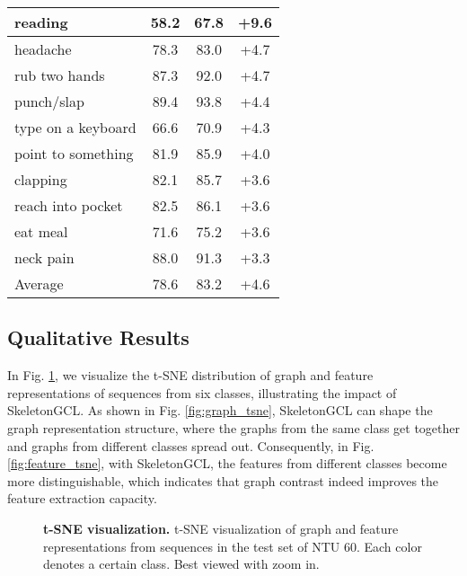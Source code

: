 \documentclass{article} \usepackage{iclr2023_conference,times}
\begin{document}
\begin{minipage}{\textwidth}
\begin{minipage}[t]{0.5\textwidth}
\begin{tabular}{l||c|c|c}
    reading            & 58.2    & 67.8          & +9.6     \\ \hline
    headache           & 78.3    & 83.0          & +4.7     \\ \hline
    rub two hands      & 87.3    & 92.0          & +4.7     \\ \hline
    punch/slap         & 89.4    & 93.8          & +4.4     \\ \hline
    type on a keyboard & 66.6    & 70.9          & +4.3     \\ \hline
    point to something & 81.9    & 85.9          & +4.0     \\ \hline
    clapping           & 82.1    & 85.7          & +3.6     \\ \hline
    reach into pocket  & 82.5    & 86.1          & +3.6     \\ \hline
    eat meal           & 71.6    & 75.2          & +3.6     \\ \hline
    neck pain          & 88.0    & 91.3          & +3.3     \\ \hline \hline
    Average            & 78.6    & 83.2          & +4.6     \\ \hline
    \end{tabular}
\label{table:top10-improved}
\end{minipage}
\end{minipage}

\subsection{Qualitative Results} In Fig. \ref{fig:tsne}, we visualize the t-SNE distribution of graph and feature representations of sequences from six classes, illustrating the impact of SkeletonGCL. As shown in Fig. \ref{fig:graph_tsne}, SkeletonGCL can shape the graph representation structure, where the graphs from the same class get together and graphs from different classes spread out. Consequently, in Fig. \ref{fig:feature_tsne}, with SkeletonGCL, the features from different classes become more distinguishable, which indicates that graph contrast indeed improves the feature extraction capacity.

\begin{figure}[htbp]
\centering  {}
\caption{\textbf{t-SNE visualization.} t-SNE \citep{t-sne} visualization of graph and feature representations from sequences in the test set of NTU 60. Each color denotes a certain class. Best viewed with zoom in.}    \label{fig:tsne}    \end{figure}
\end{document}
